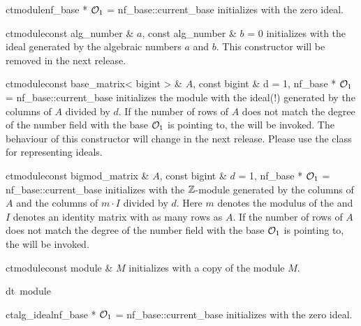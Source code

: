 
\CONS

\begin{fcode}{ct}{module}{nf_base * $\mathcal{O}_1$ = nf_base::current_base}
  initializes with the zero ideal.
\end{fcode}

\begin{fcode}{ct}{module}{const alg_number & $a$, const alg_number & $b$ = 0}
  initializes with the ideal generated by the algebraic numbers $a$ and $b$.  This constructor
  will be removed in the next release.
\end{fcode}

\begin{fcode}{ct}{module}{const base_matrix< bigint > & $A$, const bigint & d = 1,
    nf_base * $\mathcal{O}_1$ = nf_base::current_base}%
  initializes the module with the ideal(!)  generated by the columns of $A$ divided by $d$.  If
  the number of rows of $A$ does not match the degree of the number field with the base $\mathcal{O}_1$
  is pointing to, the \LEH will be invoked.  The behaviour of this constructor will change in
  the next release.  Please use the class  for representing ideals.
\end{fcode}

\begin{fcode}{ct}{module}{const bigmod_matrix & $A$, const bigint & $d$ = 1,
    nf_base * $\mathcal{O}_1$ = nf_base::current_base}%
  initializes with the $\mathbb{Z}$-module generated by the columns of $A$ and the columns of $m\cdot
  I$ divided by $d$.  Here $m$ denotes the modulus of the  and $I$ denotes
  an identity matrix with as many rows as $A$.  If the number of rows of $A$ does not match the
  degree of the number field with the base $\mathcal{O}_1$ is pointing to, the \LEH will be invoked.
\end{fcode}

\begin{fcode}{ct}{module}{const module & $M$}
  initializes with a copy of the module $M$.
\end{fcode}

\begin{fcode}{dt}{{~module}}{}
\end{fcode}

\begin{fcode}{ct}{alg_ideal}{nf_base * $\mathcal{O}_1$ = nf_base::current_base}
  initializes with the zero ideal.
\end{fcode}

